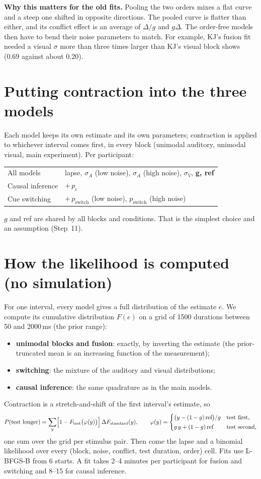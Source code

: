 \documentclass[11pt,a4paper]{article}
\newcommand{\step}[1]{\section{#1}}
\begin{document}
\textbf{Why this matters for the old fits.} Pooling the two orders mixes a flat curve and a steep one
shifted in opposite directions. The pooled curve is flatter than either, and its conflict effect is an
average of $\Delta/g$ and $g\Delta$. The order-free models then have to bend their noise parameters to
match. For example, KJ's fusion fit needed a visual $\sigma$ more than three times larger than KJ's visual
block shows (0.69 against about 0.20).

\step{Putting contraction into the three models}

Each model keeps its own estimate and its own parameters; contraction is applied to whichever interval
comes first, in every block (unimodal auditory, unimodal visual, main experiment). Per participant:
\begin{center}
\begin{tabular}{ll}
  \toprule
  All models & lapse, $\sigma_A$ (low noise), $\sigma_A$ (high noise), $\sigma_V$, \textbf{g, ref} \\
  Causal inference & $+\,p_c$ \\
  Cue switching & $+\,p_\text{switch}$ (low noise), $p_\text{switch}$ (high noise) \\
  \bottomrule
\end{tabular}
\end{center}
$g$ and ref are shared by all blocks and conditions. That is the simplest choice and an assumption
(Step~11).

\step{How the likelihood is computed (no simulation)}

For one interval, every model gives a full distribution of the estimate $e$. We compute its cumulative
distribution $F(e)$ on a grid of 1500 durations between 50 and 2000\,ms (the prior range):
\begin{itemize}
  \item \textbf{unimodal blocks and fusion}: exactly, by inverting the estimate (the prior-truncated mean
        is an increasing function of the measurement);
  \item \textbf{switching}: the mixture of the auditory and visual distributions;
  \item \textbf{causal inference}: the same quadrature as in the main models.
\end{itemize}
Contraction is a stretch-and-shift of the first interval's estimate, so
\[
  P(\text{test longer}) = \sum_{y} \Bigl[1 - F_\text{test}\bigl(\varphi(y)\bigr)\Bigr]\,
  \Delta F_\text{standard}(y),
  \qquad
  \varphi(y) =
  \begin{cases}
    \bigl(y - (1-g)\,\text{ref}\bigr)/g & \text{test first,}\\[2pt]
    g\,y + (1-g)\,\text{ref} & \text{test second,}
  \end{cases}
\]
one sum over the grid per stimulus pair. Then come the lapse and a binomial likelihood over every
(block, noise, conflict, test duration, order) cell. Fits use L-BFGS-B from 6 starts. A fit takes 2--4
minutes per participant for fusion and switching and 8--15 for causal inference.
\end{document}
